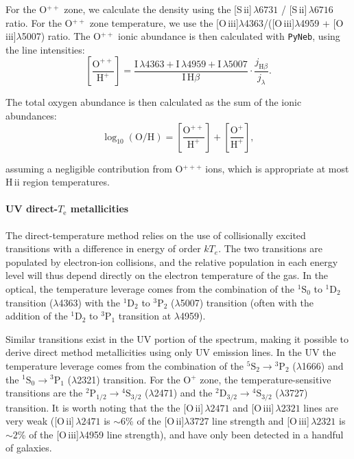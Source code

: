\documentclass[preprint2]{aastex62}
\newcommand{\hii}{H\,{\sc ii}\xspace}
\newcommand{\sii}{[S\,{\sc ii}]\xspace}
\newcommand{\oiii}{[O\,{\sc iii}]\xspace}
\newcommand{\oii}{[O\,{\sc ii}]\xspace}
\newcommand{\Te}{\ensuremath{T_{\mathrm{e}}}\xspace}
\begin{document}
For the O$^{++}$ zone, we calculate the density using the \sii$\,\lambda 6731$ / \sii$\,\lambda 6716$ ratio. For the O$^{++}$ zone temperature, we use the \oiii$\lambda$4363/(\oiii$\lambda$4959 + \oiii$\lambda$5007) ratio. The O$^{++}$ ionic abundance is then calculated with {\tt PyNeb}, using the line intensities:
\begin{equation}
    \left[ \frac{\mathrm{O}^{++}}{\mathrm{H}^{+}} \right] = \frac{\mathrm{I}\,\lambda 4363 + \mathrm{I}\,\lambda 4959 + \mathrm{I}\,\lambda 5007}{\mathrm{I}\,\mathrm{H}\beta} \cdot \frac{j_{\mathrm{H}\beta}}{j_{\lambda}}.
\end{equation}

The total oxygen abundance is then calculated as the sum of the ionic abundances:
\begin{equation}
    \log_{10}(\mathrm{O}/\mathrm{H}) = \left[ \frac{\mathrm{O}^{++}}{\mathrm{H}^{+}} \right] + \left[ \frac{\mathrm{O}^{+}}{\mathrm{H}^{+}} \right] ,
\end{equation}

assuming a negligible contribution from O$^{+++}$ ions, which is appropriate at most \hii region temperatures.

\paragraph{UV direct-\Te metallicities}
The direct-temperature method relies on the use of collisionally excited transitions with a difference in energy of order $k T_{e}$. The two transitions are populated by electron-ion collisions, and the relative population in each energy level will thus depend directly on the electron temperature of the gas. In the optical, the temperature leverage comes from the combination of the ${}^1 \mathrm{S}_0$ to ${}^1 \mathrm{D}_2$ transition ($\lambda$4363) with the  ${}^1 \mathrm{D}_2$ to ${}^3 \mathrm{P}_2$ ($\lambda$5007) transition (often with the addition of the ${}^1\mathrm{D}_2$ to $^3\mathrm{P}_1$ transition at $\lambda$4959).

Similar transitions exist in the UV portion of the spectrum, making it possible to derive direct method metallicities using only UV emission lines. In the UV the temperature leverage comes from the combination of the ${}^5 \mathrm{S}_2 \rightarrow {}^3 \mathrm{P}_2$ ($\lambda$1666) and the ${}^1 \mathrm{S}_0 \rightarrow {}^3 \mathrm{P}_1$ ($\lambda$2321) transition. For the O$^{+}$ zone, the temperature-sensitive transitions are the ${}^2 \mathrm{P}_{1/2} \rightarrow {}^4 \mathrm{S}_{3/2}$ ($\lambda$2471) and the ${}^2 \mathrm{D}_{3/2} \rightarrow {}^4 \mathrm{S}_{3/2}$ ($\lambda$3727) transition. It is worth noting that the the \oii$\,\lambda2471$ and \oiii$\,\lambda2321$ lines are very weak (\oii$\,\lambda2471$ is ${\sim}6$\% of the \oii$\lambda$3727 line strength and \oiii$\,\lambda2321$ is ${\sim}2$\% of the \oiii$\lambda$4959 line strength), and have only been detected in a handful of galaxies.
\end{document}
